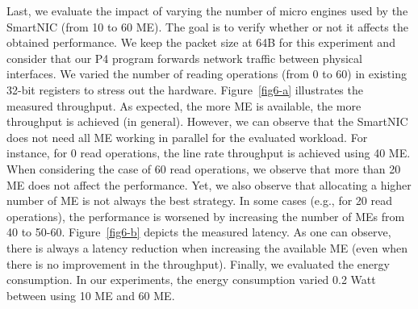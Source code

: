 Last, we evaluate the impact of varying the number of micro engines used by the SmartNIC (from 10 to 60 ME). The goal is to verify whether or not it affects the obtained performance. We keep the packet size at 64B for this experiment and consider that our P4 program forwards network traffic between physical interfaces. We varied the number of reading operations (from 0 to 60) in existing 32-bit registers to stress out the hardware. Figure~\ref{fig6-a} illustrates the measured throughput. As expected, the more ME is available, the more throughput is achieved (in general). However, we can observe that the SmartNIC does not need all ME working in parallel for the evaluated workload. For instance, for 0 read operations, the line rate throughput is achieved using 40 ME. When considering the case of 60 read operations, we observe that more than 20 ME does not affect the performance. Yet, we also observe that allocating a higher number of ME is not always the best strategy. In some cases (e.g., for 20 read operations), the performance is worsened by increasing the number of MEs from 40 to 50-60. Figure~\ref{fig6-b} depicts the measured latency. As one can observe, there is always a latency reduction when increasing the available ME (even when there is no improvement in the throughput). Finally, we evaluated the energy consumption. In our experiments, the energy consumption varied 0.2 Watt between using 10 ME and 60 ME.




